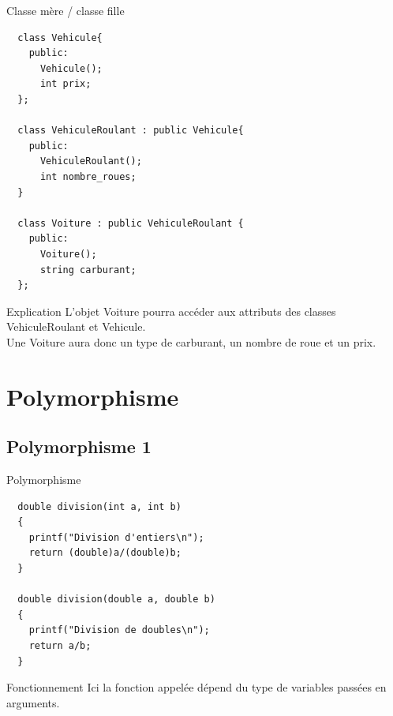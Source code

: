\documentclass{beamer}
\begin{document}
\begin{frame}[fragile]{Classe mère / classe fille}
  \begin{scriptsize}
\begin{verbatim}
  class Vehicule{
    public:
      Vehicule();
      int prix;
  };

  class VehiculeRoulant : public Vehicule{
    public:
      VehiculeRoulant();
      int nombre_roues;
  }

  class Voiture : public VehiculeRoulant {
    public:  
      Voiture();
      string carburant;
  };
\end{verbatim}  
  \begin{block}{Explication}
  L'objet Voiture pourra accéder aux attributs des classes VehiculeRoulant et Vehicule.\\
  Une Voiture aura donc un type de carburant, un nombre de roue et un prix.
  \end{block}
  \end{scriptsize}
\end{frame}

\section{Polymorphisme}
\subsection*{Polymorphisme 1}
\begin{frame}[fragile]{Polymorphisme}
  \begin{scriptsize}
\begin{verbatim}
  double division(int a, int b)
  {
    printf("Division d'entiers\n");
    return (double)a/(double)b;
  }

  double division(double a, double b)
  {
    printf("Division de doubles\n");
    return a/b;
  }
\end{verbatim}

\begin{block}{Fonctionnement}
Ici la fonction appelée dépend du type de variables passées en arguments. 
\end{block}
  \end{scriptsize}
\end{frame}
\end{document}
